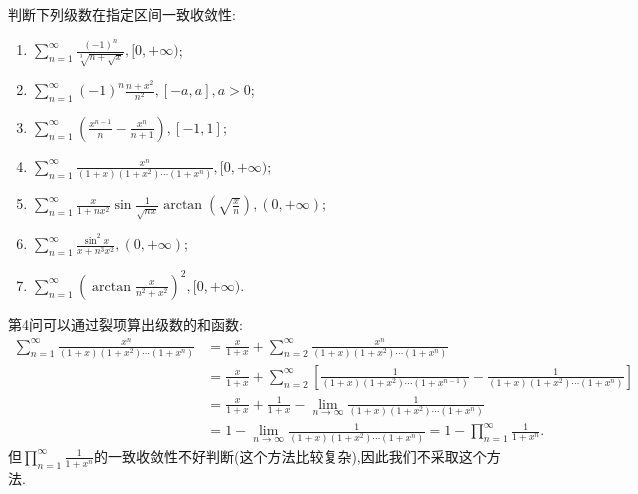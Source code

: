 \documentclass[../../main.tex]{subfiles}
\begin{document}
\begin{example}
判断下列级数在指定区间一致收敛性:
\begin{enumerate}
\item  \(\sum_{n=1}^{\infty} \frac{(-1)^n}{\sqrt[3]{n + \sqrt{x}}}, [0, +\infty)\);

\item \(\sum_{n=1}^{\infty} (-1)^n \frac{n + x^2}{n^2}, [-a, a], a > 0\);

\item \(\sum_{n=1}^{\infty} \left( \frac{x^{n - 1}}{n} - \frac{x^n}{n + 1} \right), [-1, 1]\);

\item \(\sum_{n=1}^{\infty} \frac{x^n}{(1 + x)(1 + x^2) \cdots (1 + x^n)}, [0, +\infty)\);

\item \(\sum_{n=1}^{\infty} \frac{x}{1 + nx^2} \sin \frac{1}{\sqrt{nx}} \arctan \left( \sqrt{\frac{x}{n}} \right), (0, +\infty)\);

\item \(\sum_{n=1}^{\infty} \frac{\sin^2 x}{x + n^3 x^2}, (0, +\infty)\);

\item \(\sum_{n=1}^{\infty} \left( \arctan \frac{x}{n^2 + x^2} \right)^2, [0, +\infty)\).
\end{enumerate}
\end{example}
\begin{remark}
第4问可以通过裂项算出级数的和函数:
\begin{align*}
\sum_{n=1}^{\infty}{\frac{x^n}{(1+x)(1+x^2)\cdots (1+x^n)}}&=\frac{x}{1+x}+\sum_{n=2}^{\infty}{\frac{x^n}{(1+x)(1+x^2)\cdots (1+x^n)}}
\\
&=\frac{x}{1+x}+\sum_{n=2}^{\infty}{\left[ \frac{1}{(1+x)(1+x^2)\cdots (1+x^{n-1})}-\frac{1}{(1+x)(1+x^2)\cdots (1+x^n)} \right]}
\\
&=\frac{x}{1+x}+\frac{1}{1+x}-\underset{n\rightarrow \infty}{\lim}\frac{1}{(1+x)(1+x^2)\cdots (1+x^n)}
\\
&=1-\underset{n\rightarrow \infty}{\lim}\frac{1}{(1+x)(1+x^2)\cdots (1+x^n)}=1-\prod_{n=1}^{\infty}{\frac{1}{1+x^n}}.
\end{align*}
但$\prod_{n=1}^{\infty}{\frac{1}{1+x^n}}$的一致收敛性不好判断(这个方法比较复杂),因此我们不采取这个方法.
\end{remark}
\end{document}
